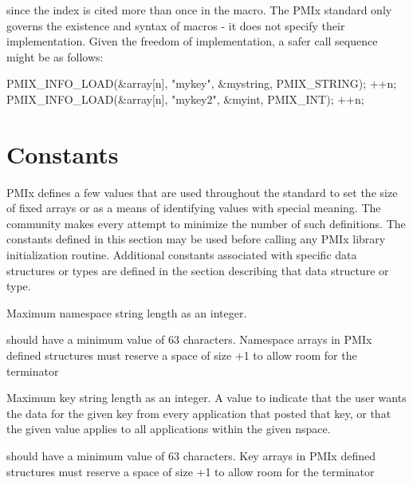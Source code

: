 since the index is cited more than once in the macro. The \ac{PMIx} standard only governs the existence and syntax of macros - it does not specify their implementation. Given the freedom of implementation, a safer call sequence might be as follows:

\begin{codepar}
PMIX_INFO_LOAD(&array[n], "mykey", &mystring, PMIX_STRING);
++n;
PMIX_INFO_LOAD(&array[n], "mykey2", &myint, PMIX_INT);
++n;
\end{codepar}

\adviceuserend

\section{Constants}

\ac{PMIx} defines a few values that are used throughout the standard to set the size of fixed arrays or as a means of identifying values with special meaning.
The community makes every attempt to minimize the number of such definitions.
The constants defined in this section may be used before calling any \ac{PMIx} library initialization routine.
Additional constants associated with specific data structures or types are defined in the section describing that data structure or type.

\begin{constantdesc}
%
Maximum namespace string length as an integer.
\end{constantdesc}

\adviceimplstart
{} should have a minimum value of 63 characters. Namespace arrays in \ac{PMIx} defined structures must reserve
a space of size +1 to allow room for the  terminator
\adviceimplend

\begin{constantdesc}
%
Maximum key string length as an integer.
%
A value to indicate that the user wants the data for the given key from every application that posted that key, or that the given value applies to all applications within the given nspace.

\end{constantdesc}

\adviceimplstart
{} should have a minimum value of 63 characters. Key arrays in \ac{PMIx} defined structures must reserve
a space of size +1 to allow room for the  terminator
\adviceimplend


